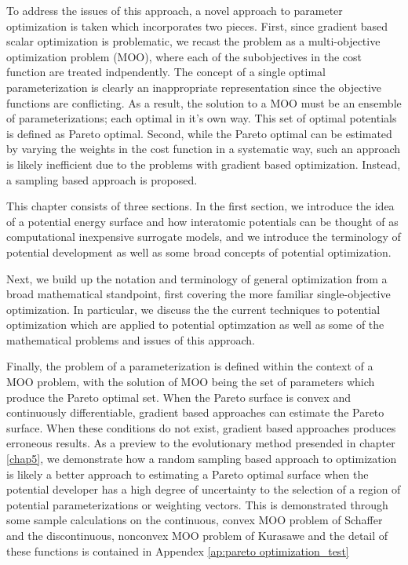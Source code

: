 To address the issues of this approach, a novel approach to parameter optimization is taken which incorporates two pieces.  First, since gradient based scalar optimization is problematic, we recast the problem as a multi-objective optimization problem (MOO), where each of the subobjectives in the cost function are treated indpendently.  The concept of a single optimal parameterization is clearly an inappropriate representation since the objective functions are conflicting.  As a result, the solution to a MOO must be an ensemble of parameterizations; each optimal in it's own way.  This set of optimal potentials is defined as Pareto optimal.  Second, while the Pareto optimal can be estimated by varying the weights in the cost function in a systematic way, such an approach is likely inefficient due to the problems with gradient based optimization.  Instead, a sampling based approach is proposed.

This chapter consists of three sections.  In the first section, we introduce the idea of a potential energy surface and how interatomic potentials can be thought of as computational inexpensive surrogate models, and we introduce the terminology of potential development as well as some broad concepts of potential optimization.

Next, we build up the notation and terminology of general optimization from a broad mathematical standpoint, first covering the more familiar single-objective optimization.  In particular, we discuss the the current techniques to potential optimization which are applied to potential optimzation as well as some of the mathematical problems and issues of this approach.

Finally, the problem of a parameterization is defined within the context of a MOO problem, with the solution of MOO being the set of parameters which produce the Pareto optimal set.  When the Pareto surface is convex and continuously differentiable, gradient based approaches can estimate the Pareto surface.  When these conditions do not exist, gradient based approaches produces erroneous results.  As a preview to the evolutionary method presended in chapter \ref{chap5}, we demonstrate how a random sampling based approach to optimization is likely a better approach to estimating a Pareto optimal surface when the potential developer has a high degree of uncertainty to the selection of a region of potential parameterizations or weighting vectors.  This is demonstrated through some sample calculations on the continuous, convex MOO  problem of Schaffer\cite{schaffer1984_pareto} and the discontinuous, nonconvex MOO problem of Kurasawe\cite{kursawe1001_pareto} and the  detail of these functions is contained in Appendex \ref{ap:pareto optimization_test}

